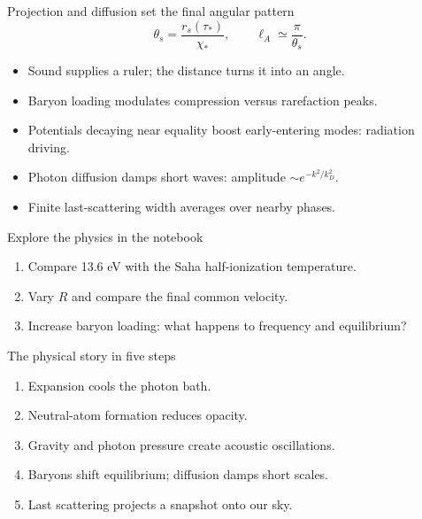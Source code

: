 \begin{frame}{Projection and diffusion set the final angular pattern}
\[\theta_s=\frac{r_s(\tau_*)}{\chi_*},\qquad \ell_A\simeq\frac{\pi}{\theta_s}.\]
\begin{itemize}
\item Sound supplies a ruler; the distance turns it into an angle.
\item Baryon loading modulates compression versus rarefaction peaks.
\item Potentials decaying near equality boost early-entering modes: radiation driving.
\item Photon diffusion damps short waves: amplitude $\sim e^{-k^2/k_D^2}$.
\item Finite last-scattering width averages over nearby phases.
\end{itemize}
\end{frame}

\begin{frame}{Explore the physics in the notebook}
\Large\colabone\normalsize
\medskip
\begin{enumerate}
\item Compare 13.6 eV with the Saha half-ionization temperature.
\item Vary $R$ and compare the final common velocity.
\item Increase baryon loading: what happens to frequency and equilibrium?
\end{enumerate}
\end{frame}

\begin{frame}{The physical story in five steps}
\begin{enumerate}
\item Expansion cools the photon bath.
\item Neutral-atom formation reduces opacity.
\item Gravity and photon pressure create acoustic oscillations.
\item Baryons shift equilibrium; diffusion damps short scales.
\item Last scattering projects a snapshot onto our sky.
\end{enumerate}
\end{frame}

